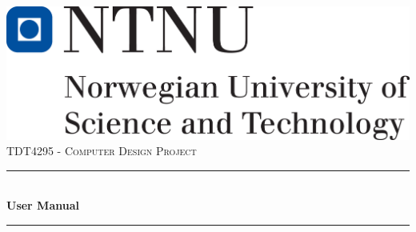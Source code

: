 \begin{titlepage}

\newcommand{\HRule}{\rule{\linewidth}{0.5mm}} %

\center %
 

\includegraphics[scale=0.3]{Images/hovedlogo_eng.png}\\[1cm] %
 

 

\textsc{\Large TDT4295 - Computer Design Project}\\[0.5cm] %


\HRule \\[0.4cm]
{ \huge \bfseries User Manual}\\[0.4cm] %
\HRule \\[0.5cm]





\end{titlepage}
